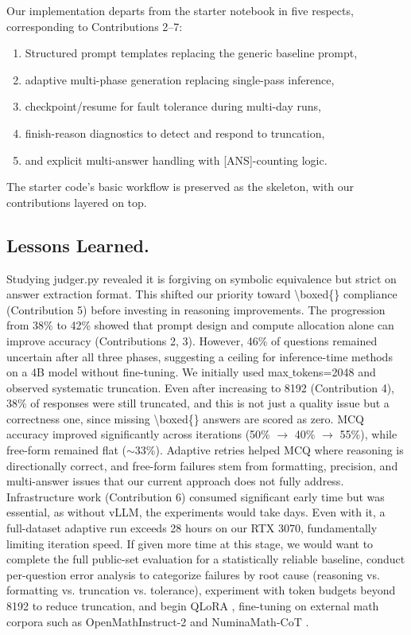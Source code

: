\documentclass{article}
\begin{document}
Our implementation departs from the starter notebook in five respects, corresponding to Contributions 2–7: 
\begin{enumerate}
    \item Structured prompt templates replacing the generic baseline prompt,
    \item adaptive multi-phase generation replacing single-pass inference,
    \item checkpoint/resume for fault tolerance during multi-day runs,
    \item finish-reason diagnostics to detect and respond to truncation,
    \item and explicit multi-answer handling with [ANS]-counting logic.
\end{enumerate}
The starter code's basic workflow is preserved as the skeleton, with our contributions layered on top.

\subsection{Lessons Learned.}
Studying judger.py revealed it is forgiving on symbolic equivalence but strict on answer extraction format. This shifted our priority toward \textbackslash boxed\{\} compliance (Contribution 5) before investing in reasoning improvements. The progression from 38\% to 42\% showed that prompt design and compute allocation alone can improve accuracy (Contributions 2, 3). However, 46\% of questions remained uncertain after all three phases, suggesting a ceiling for inference-time methods on a 4B model without fine-tuning. We initially used max$\_$tokens=2048 and observed systematic truncation. Even after increasing to 8192 (Contribution 4), 38\% of responses were still truncated, and this is not just a quality issue but a correctness one, since missing \textbackslash boxed\{\} answers are scored as zero. MCQ accuracy improved significantly across iterations (50\% $\rightarrow$ 40\% $\rightarrow$ 55\%), while free-form remained flat ($\sim$33\%). Adaptive retries helped MCQ where reasoning is directionally correct, and free-form failures stem from formatting, precision, and multi-answer issues that our current approach does not fully address. Infrastructure work (Contribution 6) consumed significant early time but was essential, as without vLLM, the experiments would take days. Even with it, a full-dataset adaptive run exceeds 28 hours on our RTX 3070, fundamentally limiting iteration speed. If given more time at this stage, we would want to complete the full public-set evaluation for a statistically reliable baseline, conduct per-question error analysis to categorize failures by root cause (reasoning vs. formatting vs. truncation vs. tolerance), experiment with token budgets beyond 8192 to reduce truncation, and begin QLoRA \cite{hu2021lora}, \cite{dettmers2023qlora} fine-tuning on external math corpora such as OpenMathInstruct-2 \cite{toshniwal2024openmath2} and NuminaMath-CoT \cite{numina2024aimo}.
\end{document}
